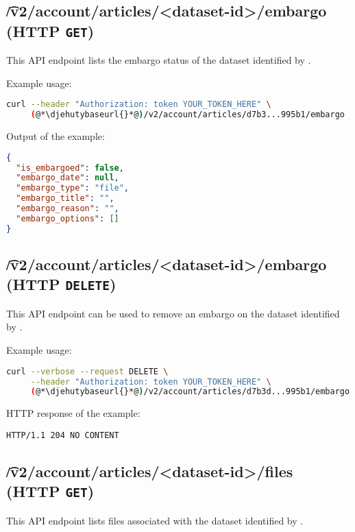 
\subsection{\t{/v2/account/articles/<dataset-id>/embargo} (HTTP \texttt{GET})}

  This API endpoint lists the embargo status of the dataset identified by .

  Example usage:
\begin{lstlisting}[language=bash]
curl --header "Authorization: token YOUR_TOKEN_HERE" \
     (@*\djehutybaseurl{}*@)/v2/account/articles/d7b3...995b1/embargo | jq
\end{lstlisting}

  Output of the example:
\begin{lstlisting}[language=JSON]
{
  "is_embargoed": false,
  "embargo_date": null,
  "embargo_type": "file",
  "embargo_title": "",
  "embargo_reason": "",
  "embargo_options": []
}
\end{lstlisting}

\subsection{\t{/v2/account/articles/<dataset-id>/embargo} (HTTP \texttt{DELETE})}

  This API endpoint can be used to remove an embargo on the dataset
  identified by \code{dataset-id}.

  Example usage:
\begin{lstlisting}[language=bash]
curl --verbose --request DELETE \
     --header "Authorization: token YOUR_TOKEN_HERE" \
     (@*\djehutybaseurl{}*@)/v2/account/articles/d7b3d...995b1/embargo
\end{lstlisting}

  HTTP response of the example:
\begin{lstlisting}
HTTP/1.1 204 NO CONTENT
\end{lstlisting}

\subsection{\t{/v2/account/articles/<dataset-id>/files} (HTTP \texttt{GET})}

  This API endpoint lists files associated with the dataset identified by
  \code{dataset-id}.

